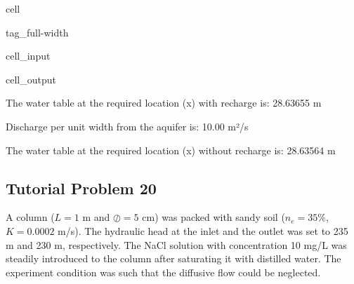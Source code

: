 \documentclass[letterpaper,10pt,english]{jupyterBook}
\begin{document}
\begin{sphinxuseclass}{cell}
\begin{sphinxuseclass}{tag_full-width}
\begin{sphinxVerbatimInput}
\begin{sphinxuseclass}{cell_input}
\begin{sphinxVerbatim}[commandchars=\\\{\}]
 
 
 
\end{sphinxVerbatim}

\end{sphinxuseclass}\end{sphinxVerbatimInput}
\begin{sphinxVerbatimOutput}

\begin{sphinxuseclass}{cell_output}
\begin{sphinxVerbatim}[commandchars=\\\{\}]
The water table at the required  location (x) with recharge is: 28.63655 m 

Discharge per unit width from the aquifer is: 10.00 m²/s 

The water table at the required  location (x) without recharge is: 28.63564 m 
\end{sphinxVerbatim}

\end{sphinxuseclass}\end{sphinxVerbatimOutput}

\end{sphinxuseclass}
\end{sphinxuseclass}

\subsection{Tutorial Problem 20}
\label{\detokenize{content/tutorials/T8/tutorial_08:tutorial-problem-20}}
\sphinxAtStartPar
A column (\(L = 1\) m and \(\oslash= 5\) cm) was packed with sandy soil (\(n_e= 35\%\),  \(K= 0.0002\) m/s). The hydraulic head at the inlet and the outlet was set to 235 m and 230 m, respectively. The NaCl solution with concentration 10 mg/L was steadily introduced to the column after saturating it with distilled water. The experiment condition was such that the diffusive flow could be neglected.
\end{document}

